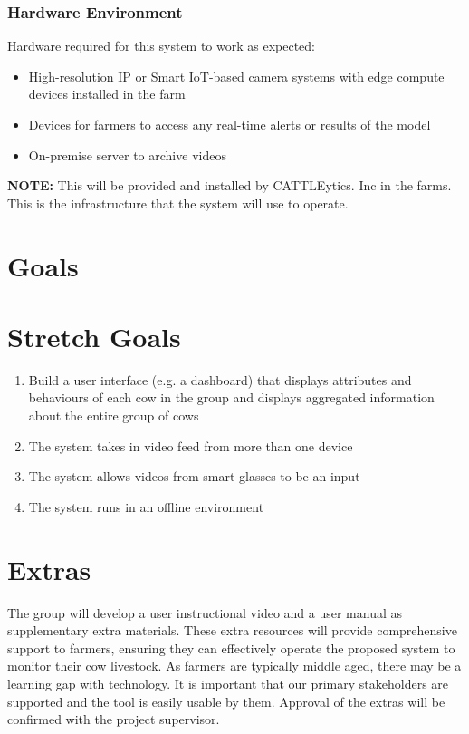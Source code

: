 \documentclass{article}
\begin{document}
\subsubsection{Hardware Environment}
Hardware required for this system to work as expected:
\begin{itemize}
    \item High-resolution IP or Smart IoT-based camera systems with edge compute devices installed in the farm
    \item Devices for farmers to access any real-time alerts or results of the model
    \item On-premise server to archive videos
\end{itemize}
\textbf{NOTE:} This will be provided and installed by CATTLEytics. Inc in the farms. This is the infrastructure that the system will use to operate.


\section{Goals}

\section{Stretch Goals}
\begin{enumerate}
    \item Build a user interface (e.g. a dashboard) that displays attributes and behaviours of each
    cow in the group and displays aggregated information about the entire group of cows
    \item The system takes in video feed from more than one device
    \item The system allows videos from smart glasses to be an input
    \item The system runs in an offline environment
\end{enumerate}

\section{Extras}

The group will develop a user instructional video and a user manual as supplementary extra materials.  These extra resources will provide comprehensive support to farmers, ensuring they can effectively operate the proposed system to monitor their cow livestock. As farmers are typically middle aged, there may be a learning gap with technology. It is important that our primary stakeholders are supported and the tool is easily usable by them. Approval of the extras will be confirmed with the project supervisor.
\end{document}
